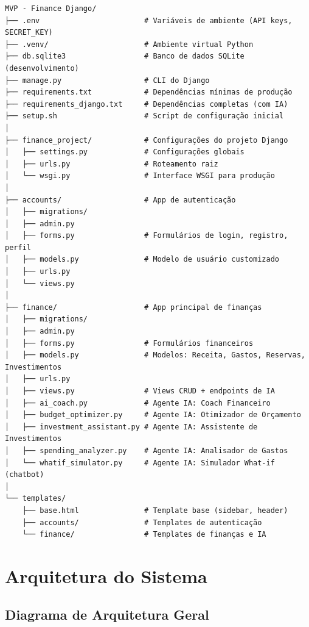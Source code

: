 \documentclass[12pt, a4paper, oneside]{report}
\begin{document}
\begin{lstlisting}[style=bash, caption={Estrutura completa do projeto}]
MVP - Finance Django/
├── .env                        # Variáveis de ambiente (API keys, SECRET_KEY)
├── .venv/                      # Ambiente virtual Python
├── db.sqlite3                  # Banco de dados SQLite (desenvolvimento)
├── manage.py                   # CLI do Django
├── requirements.txt            # Dependências mínimas de produção
├── requirements_django.txt     # Dependências completas (com IA)
├── setup.sh                    # Script de configuração inicial
│
├── finance_project/            # Configurações do projeto Django
│   ├── settings.py             # Configurações globais
│   ├── urls.py                 # Roteamento raiz
│   └── wsgi.py                 # Interface WSGI para produção
│
├── accounts/                   # App de autenticação
│   ├── migrations/
│   ├── admin.py
│   ├── forms.py                # Formulários de login, registro, perfil
│   ├── models.py               # Modelo de usuário customizado
│   ├── urls.py
│   └── views.py
│
├── finance/                    # App principal de finanças
│   ├── migrations/
│   ├── admin.py
│   ├── forms.py                # Formulários financeiros
│   ├── models.py               # Modelos: Receita, Gastos, Reservas, Investimentos
│   ├── urls.py
│   ├── views.py                # Views CRUD + endpoints de IA
│   ├── ai_coach.py             # Agente IA: Coach Financeiro
│   ├── budget_optimizer.py     # Agente IA: Otimizador de Orçamento
│   ├── investment_assistant.py # Agente IA: Assistente de Investimentos
│   ├── spending_analyzer.py    # Agente IA: Analisador de Gastos
│   └── whatif_simulator.py     # Agente IA: Simulador What-if (chatbot)
│
└── templates/
    ├── base.html               # Template base (sidebar, header)
    ├── accounts/               # Templates de autenticação
    └── finance/                # Templates de finanças e IA
\end{lstlisting}

\chapter{Arquitetura do Sistema}

\section{Diagrama de Arquitetura Geral}
\end{document}
